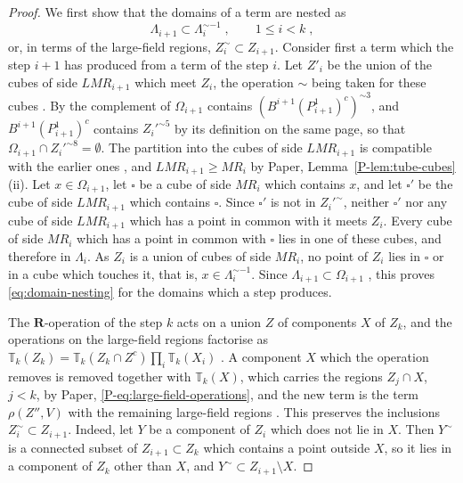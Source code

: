 \documentclass[11pt]{preprint}
\numberwithin{equation}{section}
\theoremstyle{definition}
\theoremstyle{remark}
\theoremstyle{plain}
\begin{document}
\begin{proof}
We first show that the domains of a term are nested as
\begin{equation}\label{eq:domain-nesting}
    \Lambda_{i+1} \subset \Lambda_i^{\sim-1}\;,
    \qquad
    1 \leq i < k\;,
\end{equation}
or, in terms of the large-field regions, $Z_i^{\sim} \subset Z_{i+1}$. Consider first a term which the step $i + 1$ has produced from a term of the step $i$. Let $Z'_i$ be the union of the cubes of side $LMR_{i+1}$ which meet $Z_i$, the operation $\sim$ being taken for these cubes \cite[p.~264]{BalabanCRE}. By \cite[(3.5), p.~265]{BalabanCRE} the complement of $\Omega_{i+1}$ contains $(B^{i+1}(P^1_{i+1})^c)^{\sim3}$, and $B^{i+1}(P^1_{i+1})^c$ contains $Z_i'^{\sim5}$ by its definition on the same page, so that $\Omega_{i+1} \cap Z_i'^{\sim8} = \emptyset$. The partition into the cubes of side $LMR_{i+1}$ is compatible with the earlier ones \cite[p.~264]{BalabanCRE}, and $LMR_{i+1} \geq MR_i$ by Paper, Lemma~\ref{P-lem:tube-cubes}(ii). Let $x \in \Omega_{i+1}$, let $\square$ be a cube of side $MR_i$ which contains $x$, and let $\square'$ be the cube of side $LMR_{i+1}$ which contains $\square$. Since $\square'$ is not in $Z_i'^{\sim}$, neither $\square'$ nor any cube of side $LMR_{i+1}$ which has a point in common with it meets $Z_i$. Every cube of side $MR_i$ which has a point in common with $\square$ lies in one of these cubes, and therefore in $\Lambda_i$. As $Z_i$ is a union of cubes of side $MR_i$, no point of $Z_i$ lies in $\square$ or in a cube which touches it, that is, $x \in \Lambda_i^{\sim-1}$. Since $\Lambda_{i+1} \subset \Omega_{i+1}$ \cite[(2.1), p.~254]{BalabanCRE}, this proves \eqref{eq:domain-nesting} for the domains which a step produces.

The $\mathbf R$-operation of the step $k$ acts on a union $Z$ of components $X$ of $Z_k$, and the operations on the large-field regions factorise as $\mathbb T_k(Z_k) = \mathbb T_k(Z_k \cap Z^c)\prod_i\mathbb T_k(X_i)$ \cite[(1.1), p.~177]{BalabanLFR1}. A component $X$ which the operation removes is removed together with $\mathbb T_k(X)$, which carries the regions $Z_j \cap X$, $j < k$, by Paper, \eqref{P-eq:large-field-operations}, and the new term is the term $\rho(Z'', V)$ with the remaining large-field regions \cite[(0.3), p.~176]{BalabanLFR1}. This preserves the inclusions $Z_i^{\sim} \subset Z_{i+1}$. Indeed, let $Y$ be a component of $Z_i$ which does not lie in $X$. Then $Y^{\sim}$ is a connected subset of $Z_{i+1} \subset Z_k$ which contains a point outside $X$, so it lies in a component of $Z_k$ other than $X$, and $Y^{\sim} \subset Z_{i+1} \setminus X$.


\end{proof}
\end{document}

